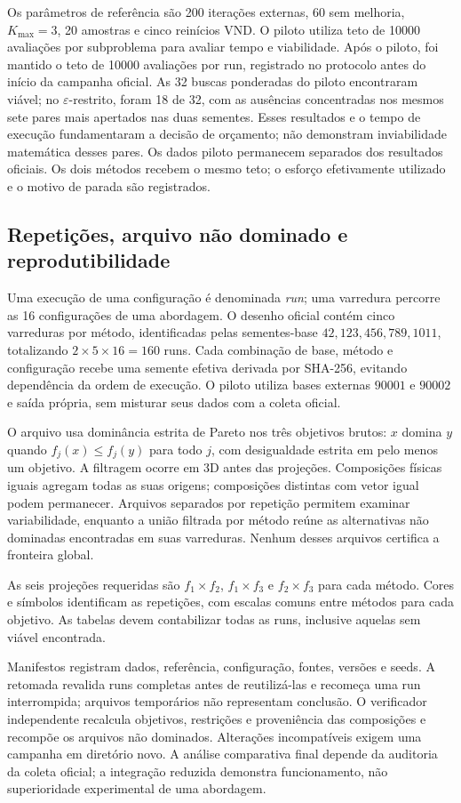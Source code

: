 Os parâmetros de referência são 200 iterações externas, 60 sem melhoria,
$K_{\max}=3$, 20 amostras e cinco reinícios VND. O piloto utiliza teto de
\num{10000} avaliações por subproblema para avaliar tempo e viabilidade.
Após o piloto, foi mantido o teto de \num{10000} avaliações por run,
registrado no protocolo antes do início da campanha oficial. As 32 buscas
ponderadas do piloto encontraram viável; no $\varepsilon$-restrito, foram
18 de 32, com as ausências concentradas nos mesmos sete pares mais apertados
nas duas sementes. Esses resultados e o tempo de execução fundamentaram
a decisão de orçamento; não demonstram inviabilidade matemática desses pares.
Os dados piloto permanecem separados dos resultados oficiais.
Os dois métodos recebem o mesmo teto;
o esforço efetivamente utilizado e o motivo de parada são registrados.

\subsection{Repetições, arquivo não dominado e reprodutibilidade}

Uma execução de uma configuração é denominada \emph{run}; uma varredura
percorre as 16 configurações de uma abordagem. O desenho oficial contém
cinco varreduras por método, identificadas pelas sementes-base
$42,123,456,789,1011$, totalizando $2\times5\times16=160$ runs.
Cada combinação de base, método e configuração recebe uma semente efetiva
derivada por SHA-256, evitando dependência da ordem de execução. O piloto
utiliza bases externas $90001$ e $90002$ e saída própria, sem misturar seus
dados com a coleta oficial.

O arquivo usa dominância estrita de Pareto nos três objetivos brutos:
$x$ domina $y$ quando $f_j(x)\leq f_j(y)$ para todo $j$, com desigualdade
estrita em pelo menos um objetivo. A filtragem ocorre em 3D antes das
projeções. Composições físicas iguais agregam todas as suas origens;
composições distintas com vetor igual podem permanecer. Arquivos separados
por repetição permitem examinar variabilidade, enquanto a união filtrada
por método reúne as alternativas não dominadas encontradas em suas varreduras.
Nenhum desses arquivos certifica a fronteira global.

As seis projeções requeridas são $f_1\times f_2$, $f_1\times f_3$ e
$f_2\times f_3$ para cada método. Cores e símbolos identificam as repetições,
com escalas comuns entre métodos para cada objetivo. As tabelas devem
contabilizar todas as runs, inclusive aquelas sem viável encontrada.

Manifestos registram dados, referência, configuração, fontes, versões e seeds.
A retomada revalida runs completas antes de reutilizá-las e recomeça uma run
interrompida; arquivos temporários não representam conclusão. O verificador
independente recalcula objetivos, restrições e proveniência das composições
e recompõe os arquivos não dominados. Alterações incompatíveis exigem uma
campanha em diretório novo. A análise comparativa final depende da auditoria
da coleta oficial; a integração reduzida demonstra funcionamento, não
superioridade experimental de uma abordagem.
